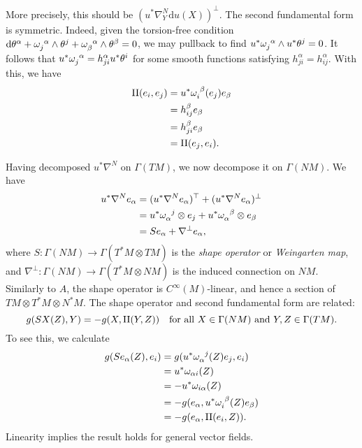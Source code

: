 \documentclass{book}
\renewcommand{\d}{\mathrm{d}}
\theoremstyle{definition}
\numberwithin{equation}{section}
\begin{document}
More precisely, this should be $(u^* \nabla^N_Y \d{u}(X))^\bot$. The second fundamental form is symmetric. Indeed, given the torsion-free condition $\d\theta^\alpha + \tensor{\omega}{_j^\alpha} \wedge \theta^j + \tensor{\omega}{_\beta^\alpha} \wedge \theta^\beta = 0$, we may pullback to find $u^* \tensor{\omega}{_j^\alpha} \wedge u^*\theta^j = 0$. It follows that $u^* \tensor{\omega}{_j^\alpha} = h_{ji}^\alpha u^* \theta^i$ for some smooth functions satisfying $h_{ji}^\alpha = h_{ij}^\alpha$. With this, we have
\begin{equation} \begin{aligned}
    {\rm II}(e_i,e_j) &= \tensor{u^* \omega}{_i^\beta}(e_j) e_\beta \\
                      &= h_{ij}^\beta e_\beta \\
                      &= h_{ji}^\beta e_\beta \\
                      &= {\rm II}(e_j,e_i).
\end{aligned} \end{equation}

Having decomposed $u^* \nabla^N$ on $\Gamma(TM)$, we now decompose it on $\Gamma(NM)$. We have 
\begin{equation} \begin{aligned}
    u^* \nabla^N e_\alpha &= (u^* \nabla^N e_\alpha)^\top + (u^* \nabla^N e_\alpha)^\bot \\
                          &= \tensor{u^* \omega}{_\alpha^j} \otimes e_j + \tensor{u^* \omega}{_\alpha^\beta} \otimes e_\beta \\
                          &= Se_\alpha + \nabla^\bot e_\alpha,
\end{aligned} \end{equation}
where $S \colon \Gamma(NM) \to \Gamma(T^*M \otimes TM)$ is the \textit{shape operator} or \textit{Weingarten map}, and $\nabla^\bot \colon \Gamma(NM) \to \Gamma(T^*M \otimes NM)$ is the induced connection on $NM$. Similarly to $A$, the shape operator is $C^\infty(M)$-linear, and hence a section of $TM \otimes T^*M \otimes N^*M$. The shape operator and second fundamental form are related:
\begin{equation}
    g(SX(Z),Y) = - g(X,{\rm II}(Y,Z)) \quad \text{for all } X \in \Gamma(NM) \text{ and } Y,Z \in \Gamma(TM).
\end{equation}
To see this, we calculate 
\begin{equation} \begin{aligned}
    g(Se_\alpha(Z),e_i) &= g(u^* \tensor{\omega}{_\alpha^j}(Z) e_j,e_i) \\
                        &= u^* \omega_{\alpha i}(Z) \\
                        &= - u^* \omega_{i\alpha}(Z) \\
                        &= - g(e_\alpha, u^* \tensor{\omega}{_i^\beta}(Z) e_\beta) \\
                        &= - g(e_\alpha, {\rm II}(e_i,Z)).
\end{aligned} \end{equation}
Linearity implies the result holds for general vector fields.
\end{document}
